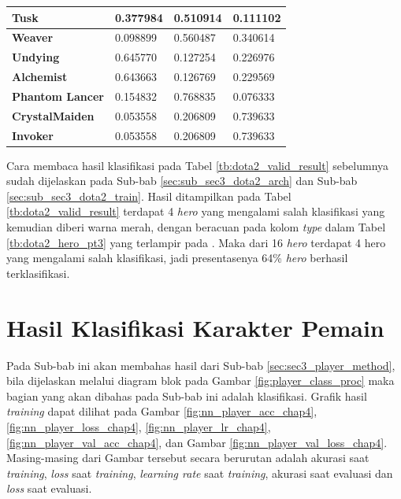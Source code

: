 \begin{longtable}{|l|l|l|l|}
	\textbf{Tusk} & 0.377984 & {\color[HTML]{FE0000} 0.510914} & 0.111102 \\ \hline
	\rowcolor[HTML]{FFFFFF} 
	\textbf{Weaver} & 0.098899 & {\color[HTML]{036400} 0.560487} & 0.340614 \\ \hline
	\rowcolor[HTML]{FFFFFF} 
	\textbf{Undying} & {\color[HTML]{036400} 0.645770} & 0.127254 & 0.226976 \\ \hline
	\rowcolor[HTML]{FFFFFF} 
	\textbf{Alchemist} & {\color[HTML]{036400} 0.643663} & 0.126769 & 0.229569 \\ \hline
	\rowcolor[HTML]{FFFFFF} 
	\textbf{Phantom Lancer} & 0.154832 & {\color[HTML]{036400} 0.768835} & 0.076333 \\ \hline
	\rowcolor[HTML]{FFFFFF} 
	\textbf{CrystalMaiden} & 0.053558 & 0.206809 & {\color[HTML]{036400} 0.739633} \\ \hline
	\rowcolor[HTML]{FFFFFF} 
	\textbf{Invoker} & 0.053558 & 0.206809 & {\color[HTML]{036400} 0.739633} \\ \hline
\end{longtable}

Cara membaca hasil klasifikasi pada Tabel \ref{tb:dota2_valid_result} sebelumnya sudah dijelaskan pada Sub-bab \ref{sec:sub_sec3_dota2_arch} dan Sub-bab \ref{sec:sub_sec3_dota2_train}. Hasil ditampilkan pada Tabel \ref{tb:dota2_valid_result} terdapat 4 \textit{hero} yang mengalami salah klasifikasi yang kemudian diberi warna merah, dengan beracuan pada kolom \textit{type} dalam Tabel \ref{tb:dota2_hero_pt3} yang terlampir pada . Maka dari 16 \textit{hero} terdapat 4 hero yang mengalami salah klasifikasi, jadi presentasenya 64\% \textit{hero} berhasil terklasifikasi.
\vspace{1ex}

\section{Hasil Klasifikasi Karakter Pemain}
\label{sec:sec4_eval_player}
\vspace{1ex}

Pada Sub-bab ini akan membahas hasil dari Sub-bab \ref{sec:sec3_player_method}, bila dijelaskan melalui diagram blok pada Gambar \ref{fig:player_class_proc} maka bagian yang akan dibahas pada Sub-bab ini adalah klasifikasi. Grafik hasil \textit{training} dapat dilihat pada Gambar \ref{fig:nn_player_acc_chap4}, \ref{fig:nn_player_loss_chap4}, \ref{fig:nn_player_lr_chap4}, \ref{fig:nn_player_val_acc_chap4}, dan Gambar \ref{fig:nn_player_val_loss_chap4}. Masing-masing dari Gambar tersebut secara berurutan adalah akurasi saat \textit{training}, \textit{loss} saat \textit{training}, \textit{learning rate} saat \textit{training}, akurasi saat evaluasi dan \textit{loss} saat evaluasi.
\vspace{2ex}

